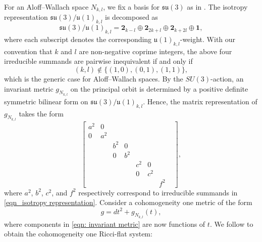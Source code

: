 \documentclass[11pt,letterpaper]{amsart}
\theoremstyle{definition}
\numberwithin{equation}{section}
\begin{document}
For an Aloff–Wallach space $N_{k,l}$, we fix a basis for $\mathfrak{su}(3)$ as in \cite[(4.3)]{reidegeld2011exceptional}. The isotropy representation $\mathfrak{su}(3)/\mathfrak{u}(1)_{k,l}$ is decomposed as 
\begin{equation}
\label{eqn_isotropy representation}
\mathfrak{su}(3)/\mathfrak{u}(1)_{k,l}=\mathbf{2}_{k-l}\oplus  \mathbf{2}_{2k+l}\oplus  \mathbf{2}_{k+2l}\oplus \mathbf{1},
\end{equation}
where each subscript denotes the corresponding $\mathfrak{u}(1)_{k,l}$-weight. With our convention that $k$ and $l$ are non-negative coprime integers, the above four irreducible summands are pairwise inequivalent if and only if 
$$(k,l)\notin\{(1,0),(0,1),(1,1)\},$$ 
which is the generic case for Aloff–Wallach spaces. By the $SU(3)$-action, an invariant metric $g_{N_{k,l}}$ on the principal orbit is determined by a positive definite symmetric bilinear form on $\mathfrak{su}(3)/\mathfrak{u}(1)_{k,l}$. Hence, the matrix representation of $g_{N_{k,l}}$ takes the form
\begin{equation}
\label{eqn: invariant metric}
\begin{bmatrix}
a^2&0&&&&&\\
0&a^2&&&&&&\\
&&b^2&0&&&\\
&&0&b^2&&&\\
&&&&c^2&0&\\
&&&&0&c^2&\\
&&&&&&f^2
\end{bmatrix},
\end{equation}
where $a^2$, $b^2$, $c^2$, and $f^2$ respectively correspond to irreducible summands in \eqref{eqn_isotropy representation}.
Consider a cohomogeneity one metric of the form 
$$g=dt^2+g_{N_{k,l}}(t),$$ where components in \eqref{eqn: invariant metric} are now functions of $t$. We follow \cite{eschenburg_initial_2000, reidegeld2011exceptional} to obtain the cohomogeneity one Ricci-flat system:
\end{document}
